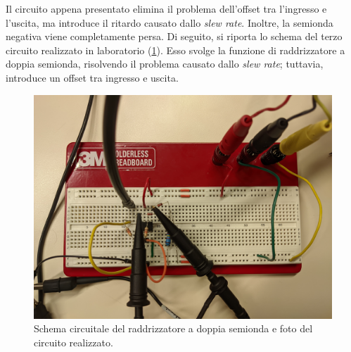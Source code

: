 \clearpage
Il circuito appena presentato elimina il problema dell'offset tra l'ingresso e l'uscita, ma introduce il ritardo causato dallo \textit{slew rate}. Inoltre, la semionda negativa viene completamente persa. Di seguito, si riporta lo schema del terzo circuito realizzato in laboratorio (\Fig\ref{fig:circuito_3}). Esso svolge la funzione di raddrizzatore a doppia semionda, risolvendo il problema causato dallo \textit{slew rate}; tuttavia, introduce un offset tra ingresso e uscita.

\begin{figure}[ht!]
	\centering
	\begin{minipage}{.45\textwidth}
	\end{minipage}\qquad
	\begin{minipage}{.45\textwidth}
		\includegraphics[width=\linewidth]{./ImageFiles/Laboratorio 2/CIR3.jpg}
	\end{minipage}
	\caption{Schema circuitale del raddrizzatore a doppia semionda e foto del circuito realizzato.}
	\label{fig:circuito_3}
\end{figure}

